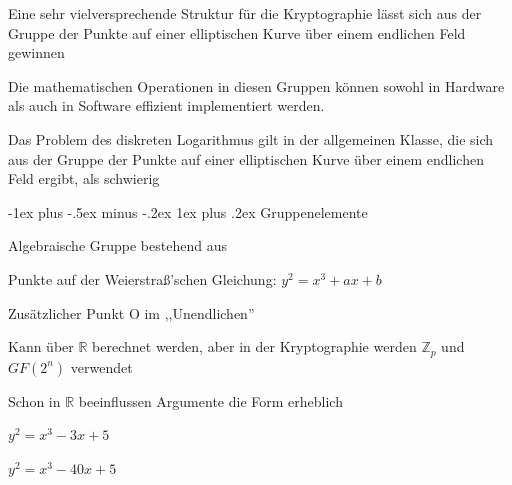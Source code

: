 \documentclass[a4paper]{article}
\makeatletter
\renewcommand{\subsubsection}{\@startsection{subsubsection}{3}{0mm}%
 {-1ex plus -.5ex minus -.2ex}%
 {1ex plus .2ex}%
 {\normalfont\small\bfseries}}
\makeatother
\begin{document}
\begin{multicols}{3}
\begin{itemize*}
            \item Eine sehr vielversprechende Struktur für die Kryptographie lässt sich aus der Gruppe der Punkte auf einer elliptischen Kurve über einem endlichen Feld gewinnen
            \begin{itemize*}
                  \item Die mathematischen Operationen in diesen Gruppen können sowohl in Hardware als auch in Software effizient implementiert werden.
                  \item Das Problem des diskreten Logarithmus gilt in der allgemeinen Klasse, die sich aus der Gruppe der Punkte auf einer elliptischen Kurve über einem endlichen Feld ergibt, als schwierig
            \end{itemize*}
      \end{itemize*}

      \subsubsection{Gruppenelemente}
      \begin{itemize*}
            \item Algebraische Gruppe bestehend aus
            \begin{itemize*}
                  \item Punkte auf der Weierstraß'schen Gleichung: $y^2 = x^3 + ax + b$
                  \item Zusätzlicher Punkt O im ,,Unendlichen''
            \end{itemize*}
            \item Kann über $\mathbb{R}$ berechnet werden, aber in der Kryptographie werden $\mathbb{Z}_p$ und $GF(2^n)$ verwendet
            \begin{itemize*}
                  \item Schon in $\mathbb{R}$ beeinflussen Argumente die Form erheblich
                  \item $y^2 = x^3-3x+5$ %
                  \item $y^2 = x^3-40x+5$ %
            \end{itemize*}
      \end{itemize*}


\end{multicols}
\end{document}
